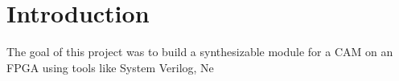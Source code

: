 \section{Introduction}
The goal of this project was to build a synthesizable module for a CAM on an FPGA using tools like System Verilog, Ne